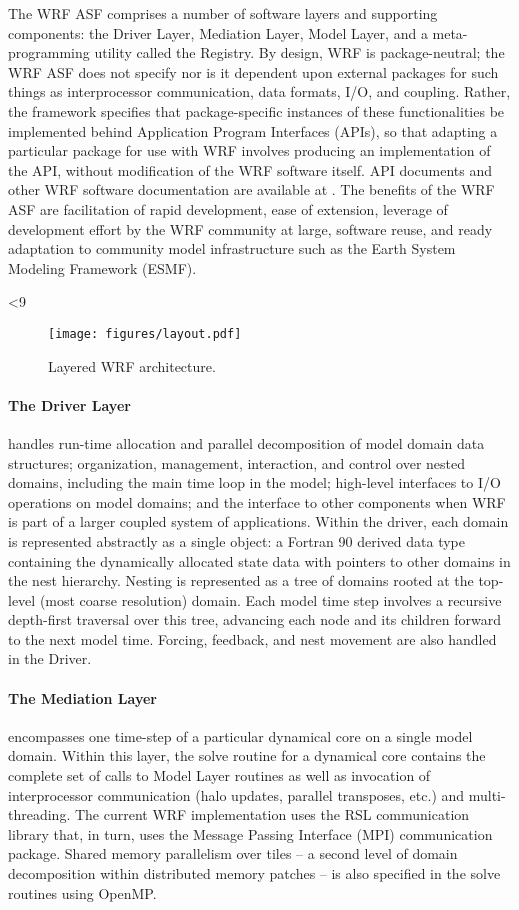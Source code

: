 The WRF ASF comprises a number of software layers and supporting
components: the Driver Layer, Mediation Layer, Model Layer, and a
meta-programming utility called the Registry.  By design, WRF is
package-neutral; the WRF ASF does not specify nor is it dependent upon
external packages for such things as interprocessor communication, data
formats, I/O, and coupling. Rather, the framework specifies that
package-specific instances of these functionalities be implemented
behind Application Program Interfaces (APIs), so that adapting a
particular package for use with WRF involves producing an
implementation of the API, without modification of the WRF software
itself.  API documents and other WRF software documentation are
available at \citep{sasi}.  The
benefits of the WRF ASF are facilitation of rapid development, ease of
extension, leverage of development effort by the WRF community at
large, software reuse, and ready adaptation to community model
infrastructure such as the Earth System Modeling Framework (ESMF).

%
%
\ifnum{}<9
\begin{figure}
  \centering
  \texttt{[image: figures/layout.pdf]}
  \caption{\label{figure:5a}Layered WRF architecture.}
\end{figure}
\fi

\paragraph{The Driver Layer} 
handles run-time allocation and parallel decomposition
of model domain data structures; organization, management, interaction,
and control over nested domains, including the main time loop in the
model; high-level interfaces to I/O operations on model domains; and
the interface to other components when WRF is part of a larger coupled
system of applications.  Within the driver, each domain is represented
abstractly as a single object: a Fortran 90  derived data type containing
the dynamically allocated state data with pointers to other domains in
the nest hierarchy. Nesting is represented as a tree of domains rooted
at the top-level (most coarse resolution) domain. Each model time step
involves a recursive depth-first traversal over this tree, advancing
each node and its children forward to the next model time. Forcing,
feedback, and nest movement are also handled in the Driver.

\paragraph{The Mediation Layer} 
encompasses one time-step of a particular dynamical
core on a single model domain. Within this layer, the solve routine for
a dynamical core contains the complete set of calls to Model Layer
routines as well as invocation of interprocessor communication (halo
updates, parallel transposes, etc.) and multi-threading. The current
WRF implementation uses the RSL communication library
\citep{michalak00} that, in turn, uses the Message Passing Interface
(MPI) communication package.  Shared memory parallelism over tiles
-- a second level of domain decomposition within distributed
memory patches -- is also specified in the solve routines using
OpenMP.  

